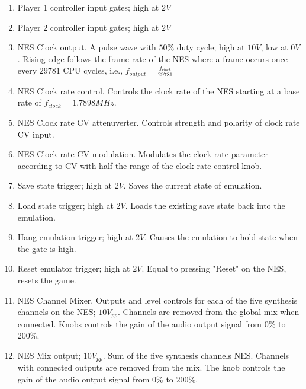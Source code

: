 \documentclass[12pt,a4paper]{article}
\begin{document}
\begin{enumerate}
  \item Player 1 controller input gates; high at $2V$
  \item Player 2 controller input gates; high at $2V$
  \item NES Clock output. A pulse wave with $50\%$ duty cycle; high at $10V$, low at $0V$. Rising edge follows the frame-rate of the NES where a frame occurs once every $29781$ CPU cycles, i.e., $f_{output} = \frac{f_{clock}}{29781}$
  \item NES Clock rate control. Controls the clock rate of the NES starting at a base rate of $f_{clock} = 1.7898MHz$.
  \item NES Clock rate CV attenuverter. Controls strength and polarity of clock rate CV input.
  \item NES Clock rate CV modulation. Modulates the clock rate parameter according to CV with half the range of the clock rate control knob.
  \item Save state trigger; high at $2V$. Saves the current state of emulation.
  \item Load state trigger; high at $2V$. Loads the existing save state back into the emulation.
  \item Hang emulation trigger; high at $2V$. Causes the emulation to hold state when the gate is high.
  \item Reset emulator trigger; high at $2V$. Equal to pressing "Reset" on the NES, resets the game.
  \item NES Channel Mixer. Outputs and level controls for each of the five synthesis channels on the NES; $10V_{pp}$. Channels are removed from the global mix when connected. Knobs controls the gain of the audio output signal from $0\%$ to $200\%$.
  \item NES Mix output; $10V_{pp}$. Sum of the five synthesis channels NES. Channels with connected outputs are removed from the mix. The knob controls the gain of the audio output signal from $0\%$ to $200\%$.
\end{enumerate}


\clearpage
\renewcommand\refname{References \& Acknowledgments}
\nocite{*}


\end{document}
